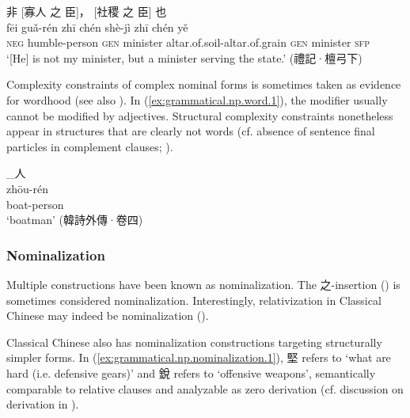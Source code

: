 \documentclass[UTF8, a4paper, oneside, scheme=plain, 12pt]{ctexrep}
\newcommand{\translate}[1]{`#1'}
\newcommand*{\category}[1]{\textsc{#1}}
\begin{document}
\begin{exe}
    \ex\label{ex:grammatical.np.word.2}
    \glll
    非 [寡人 之 臣]， [社稷 之 臣] 也 \\
    fēi guǎ-rén zhī chén shè-jì zhī chén yě \\
    \category{neg} humble-person \category{gen} minister altar.of.soil-altar.of.grain \category{gen} minister \category{sfp} \\
    \glt\translate{[He] is not my minister, but a minister serving the state.} \hfill (禮記·檀弓下)
\end{exe}

Complexity constraints of complex nominal forms 
is sometimes taken as evidence for wordhood (see also ). 
In (\ref{ex:grammatical.np.word.1}), the modifier usually cannot be modified by adjectives.
Structural complexity constraints nonetheless appear in structures that are clearly not words (cf. absence of sentence final particles in complement clauses; ).

\begin{exe}
    \ex\label{ex:grammatical.np.word.1}
    \glll
    [舟]_{}人 \\
    zhōu-rén \\
    boat-person \\
    \glt\translate{boatman} \hfill (韓詩外傳·卷四)
\end{exe}







\subsubsection{Nominalization}

Multiple constructions have been known as nominalization.
The 之-insertion () is sometimes considered nominalization.
Interestingly, relativization in Classical Chinese may indeed be nominalization ().

Classical Chinese also has nominalization constructions targeting structurally simpler forms.
In (\ref{ex:grammatical.np.nominalization.1}),
堅 refers to \translate{what are hard (i.e. defensive gears)}
and 銳 refers to \translate{offensive weapons},
semantically comparable to relative clauses and analyzable as zero derivation (cf. discussion on derivation in ).
\end{document}

